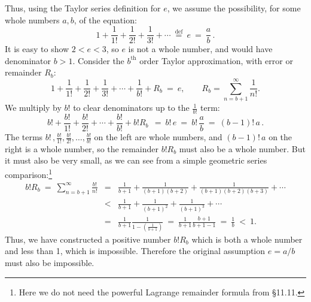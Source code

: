 \documentclass[11pt]{article}
\begin{document}
Thus, using the Taylor series definition for $e$, we assume the possibility, 
for some whole numbers $a,b$, of the equation:
$$
1 + \frac{1}{1!} + \frac{1}{2!} +\frac{1}{3!}+ \cdots \ \stackrel{\text{def}}{=}\ e \ =\ \frac ab\,.
$$
It is easy to show $2<e<3$, so $e$ is not a whole number, and would have denominator $b>1$.
Consider the $b^{\mathrm{th}}$ order Taylor approximation,
with error or remainder $R_b$:
$$
1 + \frac{1}{1!} + \frac{1}{2!} +\frac{1}{3!}+ \cdots + \frac{1}{b!}+ R_b \ = \ e,
\qquad
R_b= \sum_{n= b+1}^\infty \frac{1}{n!}.
$$
We multiply by $b!$ to clear denominators up to the $\frac 1{b!}$ term:
$$
b! + \frac{b!}{1!} + \frac{b!}{2!} + \cdots +\frac{b!}{b!}+b!R_b\ \ =\ b!\, e \ =\ b!\,\frac ab \ =\ (b{-}1)!\, a\,.
$$
The terms $b!\,, \frac{b!}{1!}, \frac{b!}{2!}, \ldots ,\frac{b!}{b!}$ on the left
are whole numbers, and $(b{-}1)!\,a$ on the right is a whole number, 
so the remainder $b!R_b$ must also be a whole number.
But it must also be very small,
as we can see from a simple geometric series comparison:\footnote{
Here we do not need the powerful Lagrange remainder formula from \S11.11.
}
$$\begin{array}{rcl}
b!R_b
\ = \  \sum\limits_{n= b+1}^\infty \frac{b!}{n!}
&=&
\frac{1}{b{+}1} + \frac{1}{(b{+}1)(b{+}2)} + \frac{1}{(b{+}1)(b{+}2)(b{+}3)}+\cdots
\\[1em]
&<&
\frac{1}{b+1} + \frac{1}{(b{+}1)^2} + \frac{1}{(b{+}1)^3}+\cdots
\\[1em]
& = & \frac{1}{b{+}1}\frac{1}{1 -(\frac1{b+1})}\ =\ \frac{1}{b{+}1}\frac{b+1}{b+1-1}
\ =\ \frac1b \ < \ 1.
\end{array}$$
Thus, we have constructed a positive number $b!R_b$ which is both a whole number 
and less than 1, which is impossible. 
Therefore the original assumption $e=a/b$ must also be impossible.
\end{document}
